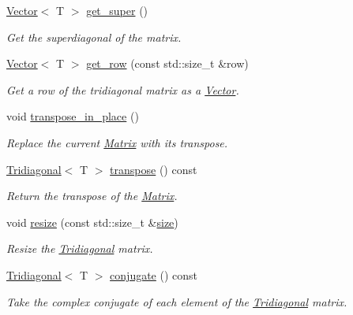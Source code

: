 \begin{DoxyCompactItemize}
\hyperlink{classLuna_1_1Vector}{Vector}$<$ T $>$ \hyperlink{classLuna_1_1Tridiagonal_aeb826920a890dec25c7817418ccaa8cb}{get\+\_\+super} ()
\begin{DoxyCompactList}\small\item\em Get the superdiagonal of the matrix. \end{DoxyCompactList}\item 
\hyperlink{classLuna_1_1Vector}{Vector}$<$ T $>$ \hyperlink{classLuna_1_1Tridiagonal_a4199f825838490b1a708dfa953963ce5}{get\+\_\+row} (const std\+::size\+\_\+t \&row)
\begin{DoxyCompactList}\small\item\em Get a row of the tridiagonal matrix as a \hyperlink{classLuna_1_1Vector}{Vector}. \end{DoxyCompactList}\item 
void \hyperlink{classLuna_1_1Tridiagonal_a97a6ebf42711983a047675211e2a277b}{transpose\+\_\+in\+\_\+place} ()
\begin{DoxyCompactList}\small\item\em Replace the current \hyperlink{classLuna_1_1Matrix}{Matrix} with its transpose. \end{DoxyCompactList}\item 
\hyperlink{classLuna_1_1Tridiagonal}{Tridiagonal}$<$ T $>$ \hyperlink{classLuna_1_1Tridiagonal_ad4a4209b7a20a65fce5c66444af3249e}{transpose} () const
\begin{DoxyCompactList}\small\item\em Return the transpose of the \hyperlink{classLuna_1_1Matrix}{Matrix}. \end{DoxyCompactList}\item 
void \hyperlink{classLuna_1_1Tridiagonal_aafeede93e34d8418725ae97c645e54cc}{resize} (const std\+::size\+\_\+t \&\hyperlink{classLuna_1_1Tridiagonal_ae8586e82968a8c28f7c50008e1f75411}{size})
\begin{DoxyCompactList}\small\item\em Resize the \hyperlink{classLuna_1_1Tridiagonal}{Tridiagonal} matrix. \end{DoxyCompactList}\item 
\hyperlink{classLuna_1_1Tridiagonal}{Tridiagonal}$<$ T $>$ \hyperlink{classLuna_1_1Tridiagonal_a0338abe2f0237df28f96324a7d11d4df}{conjugate} () const
\begin{DoxyCompactList}\small\item\em Take the complex conjugate of each element of the \hyperlink{classLuna_1_1Tridiagonal}{Tridiagonal} matrix. \end{DoxyCompactList}\item 

\end{DoxyCompactItemize}
